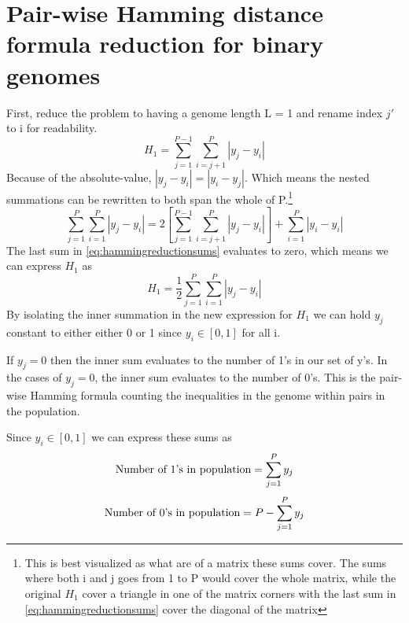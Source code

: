 \section{Pair-wise Hamming distance formula reduction for binary genomes}\label{Hammingreduction}
First, reduce the problem to having a genome length L = 1 and rename index \({j}'\) to i for readability.
\begin{equation*}
    H_{1}=\sum_{j=1}^{P-1}\sum_{i=j+1}^{P}\left |y_{j}-y_{i}\right |
\end{equation*}
Because of the absolute-value, \(\left |y_{j}-y_{i}\right | =\left |y_{i}-y_{j}\right |\). Which means the nested summations can be rewritten to both span the whole of P.\footnote{This is best visualized as what are of a matrix these sums cover. The sums where both i and j goes from 1 to P would cover the whole matrix, while the original \(H_{1}\) cover a triangle in one of the matrix corners with the last sum in \ref{eq:hammingreductionsums} cover the diagonal of the matrix}
\begin{equation}
    \label{eq:hammingreductionsums}
    \sum_{j=1}^{P}\sum_{i=1}^{P}\left | y_{j}-y_{i} \right | = 2\left [ \sum_{j=1}^{P-1}\sum_{i=j+1}^{P}\left | y_{j}-y_{i} \right | \right ]+ \sum_{i=1}^{P}\left | y_{i}-y_{i} \right | 
\end{equation}
The last sum in \ref{eq:hammingreductionsums} evaluates to zero, which means we can express \(H_{1}\) as 
\begin{equation*}
    H_{1} = \frac{1}{2}\sum_{j=1}^{P}\sum_{i=1}^{P}\left | y_{j}-y_{i} \right |
\end{equation*}
By isolating the inner summation in the new expression for \(H_{1}\) we can hold \(y_{j}\) constant to either either 0 or 1 since \(y_{i}\in\left [0, 1\right]\) for all i.

If \(y_{j}=0\) then the inner sum evaluates to the number of 1's in our set of y's. 
In the cases of \(y_{j}=0\), the inner sum evaluates to the number of 0's. This is the pair-wise Hamming formula counting the inequalities in the genome within pairs in the population.

Since \(y_{i}\in\left [0, 1\right]\) we can express these sums as
\begin{equation*}
    \textnormal{Number of 1's in population} = \sum_{j=1}^{P}y_{j} 
\end{equation*}
\begin{equation*}
    \textnormal{Number of 0's in population} = P-\sum_{j=1}^{P}y_{j}
\end{equation*}

